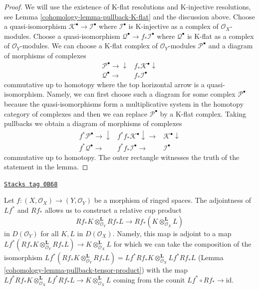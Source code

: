 \begin{proof}

We will use the existence of K-flat resolutions and
K-injective resolutions, see Lemma \ref{cohomology-lemma-pullback-K-flat}
and the discussion above. Choose a quasi-isomorphism
$\mathcal{K}^\bullet \to \mathcal{I}^\bullet$ where $\mathcal{I}^\bullet$
is K-injective as a complex of $\mathcal{O}_X$-modules.
Choose a quasi-isomorphism $\mathcal{Q}^\bullet \to f_*\mathcal{I}^\bullet$
where $\mathcal{Q}^\bullet$ is K-flat as a complex of
$\mathcal{O}_Y$-modules. We can choose a K-flat complex of
$\mathcal{O}_Y$-modules $\mathcal{P}^\bullet$
and a diagram of morphisms of complexes
$$
\begin{array}{cc}\mathcal{P}^\bullet \longrightarrow\downarrow & f_*\mathcal{K}^\bullet \downarrow \\ \mathcal{Q}^\bullet \longrightarrow & f_*\mathcal{I}^\bullet\end{array}
$$
commutative up to homotopy where the top horizontal arrow
is a quasi-isomorphism. Namely, we can first choose such a
diagram for some complex $\mathcal{P}^\bullet$ because
the quasi-isomorphisms form a multiplicative system in
the homotopy category of complexes and then we can replace
$\mathcal{P}^\bullet$ by a K-flat complex.
Taking pullbacks we obtain a diagram of morphisms of complexes
$$
\begin{array}{ccc}f^*\mathcal{P}^\bullet \longrightarrow\downarrow & f^*f_*\mathcal{K}^\bullet \downarrow\longrightarrow & \mathcal{K}^\bullet \downarrow \\ f^*\mathcal{Q}^\bullet \longrightarrow & f^*f_*\mathcal{I}^\bullet \longrightarrow & \mathcal{I}^\bullet\end{array}
$$
commutative up to homotopy. The outer rectangle witnesses the
truth of the statement in the lemma.
\end{proof}

\begin{remark}
\label{cohomology-remark-cup-product}
\href{https://stacks.math.columbia.edu/tag/0B68}{\texttt{Stacks tag 0B68}}

Let $f : (X, \mathcal{O}_X) \to (Y, \mathcal{O}_Y)$ be a morphism of
ringed spaces. The adjointness of $Lf^*$ and $Rf_*$ allows us to construct
a relative cup product
$$
Rf_*K \otimes_{\mathcal{O}_Y}^\mathbf{L} Rf_*L
\longrightarrow
Rf_*(K \otimes_{\mathcal{O}_X}^\mathbf{L} L)
$$
in $D(\mathcal{O}_Y)$ for all $K, L$ in $D(\mathcal{O}_X)$.
Namely, this map is adjoint to a map
$Lf^*(Rf_*K \otimes_{\mathcal{O}_Y}^\mathbf{L} Rf_*L) \to
K \otimes_{\mathcal{O}_X}^\mathbf{L} L$ for which we can take the
composition of the isomorphism
$Lf^*(Rf_*K \otimes_{\mathcal{O}_Y}^\mathbf{L} Rf_*L) =
Lf^*Rf_*K \otimes_{\mathcal{O}_X}^\mathbf{L} Lf^*Rf_*L$
(Lemma \ref{cohomology-lemma-pullback-tensor-product})
with the map
$Lf^*Rf_*K \otimes_{\mathcal{O}_X}^\mathbf{L} Lf^*Rf_*L
\to K \otimes_{\mathcal{O}_X}^\mathbf{L} L$
coming from the counit $Lf^* \circ Rf_* \to \text{id}$.
\end{remark}

